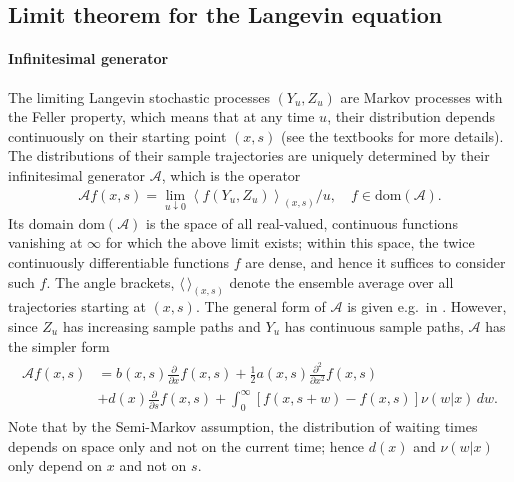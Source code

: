 \documentclass[a4paper,12pt]{elsarticle}
\numberwithin{equation}{section}
\theoremstyle{plain}
\theoremstyle{definition}
\theoremstyle{remark}
\numberwithin{equation}{section}
\newcommand{\1}{\mathbf 1}
\newcommand{\del}{\partial}
\begin{document}
\subsection{Limit theorem for the Langevin equation}
\label{subsec:convergence}
\paragraph{Infinitesimal generator}
The limiting Langevin stochastic processes $(Y_u,Z_u)$ are Markov
processes with the Feller property, which means that at any time $u$, their distribution depends 
continuously on their starting point $(x,s)$ (see the textbooks 
\cite{Kallenberg, Applebaum} for more details).
The distributions of their sample trajectories
are uniquely determined by their infinitesimal generator $\mathcal A$, 
which is the operator
\begin{align}
\mathcal A f(x,s) = \lim_{u \downarrow 0}
\left \langle f(Y_u, Z_u)\right \rangle_{(x,s)} / u, 
\quad f \in \text{dom}(\mathcal A).
\end{align}
Its domain $\text{dom}(\mathcal A)$ is the space of all real-valued, 
continuous functions vanishing at $\infty$ for which the above limit exists;
within this space, the twice continuously differentiable functions $f$ are 
dense, and hence it suffices to consider such $f$.
The angle brackets, $\langle \, \rangle_{(x,s)}$ denote the ensemble average over all
trajectories starting at $(x,s)$. 
The general form of $\mathcal A$ is given e.g.\ in 
\cite[Section 6.7.1]{Applebaum}. 
However, since $Z_u$ has increasing sample paths and $Y_u$ has 
continuous sample paths, $\mathcal A$ has the simpler form
\begin{align} \label{eq:inf-gen}
\begin{split}
\mathcal A f(x,s)
&= b(x,s) \frac{\del }{\del x} f(x,s)
+\frac{1}{2} a(x,s) \frac{\del^2}{\del x^2} f(x,s)\\
&+ d(x) \frac{\partial}{\partial s} f(x,s)
+ \int_0^\infty \left[f(x,s+w)-f(x,s)
\right] \nu(w|x)\, dw.
\end{split}
\end{align}
Note that by the Semi-Markov assumption, 
the distribution of waiting times depends on space only and not
on the current time; 
hence $d(x)$ and $\nu(w|x)$ only depend on $x$ and not on $s$.
\end{document}
